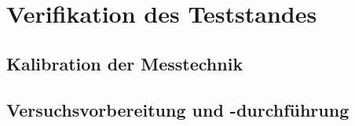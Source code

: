 

\chapter{Verifikation des Teststandes}\label{cha:4}


\section{Kalibration der Messtechnik}\label{cha:4_Kalibration_Messtechnik}





    
    
    
    
    
    
\section{Versuchsvorbereitung und -durchführung}\label{cha:4_Versuchsvorbereitung_und_Durchfuehrung}